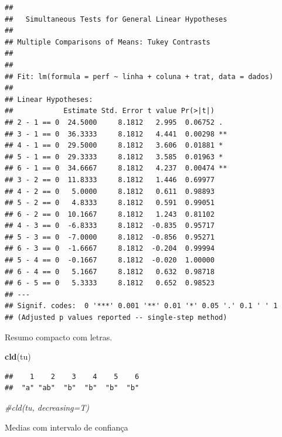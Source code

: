 \documentclass[
]{book}
\newenvironment{Shaded}{\begin{snugshade}}{\end{snugshade}}
\newcommand{\CommentTok}[1]{\textcolor[rgb]{0.56,0.35,0.01}{\textit{#1}}}
\newcommand{\DataTypeTok}[1]{\textcolor[rgb]{0.13,0.29,0.53}{#1}}
\newcommand{\KeywordTok}[1]{\textcolor[rgb]{0.13,0.29,0.53}{\textbf{#1}}}
\newcommand{\NormalTok}[1]{#1}
\newcommand{\OperatorTok}[1]{\textcolor[rgb]{0.81,0.36,0.00}{\textbf{#1}}}
\newcommand{\StringTok}[1]{\textcolor[rgb]{0.31,0.60,0.02}{#1}}
\begin{document}
\begin{verbatim}
## 
##   Simultaneous Tests for General Linear Hypotheses
## 
## Multiple Comparisons of Means: Tukey Contrasts
## 
## 
## Fit: lm(formula = perf ~ linha + coluna + trat, data = dados)
## 
## Linear Hypotheses:
##            Estimate Std. Error t value Pr(>|t|)   
## 2 - 1 == 0  24.5000     8.1812   2.995  0.06752 . 
## 3 - 1 == 0  36.3333     8.1812   4.441  0.00298 **
## 4 - 1 == 0  29.5000     8.1812   3.606  0.01881 * 
## 5 - 1 == 0  29.3333     8.1812   3.585  0.01963 * 
## 6 - 1 == 0  34.6667     8.1812   4.237  0.00474 **
## 3 - 2 == 0  11.8333     8.1812   1.446  0.69977   
## 4 - 2 == 0   5.0000     8.1812   0.611  0.98893   
## 5 - 2 == 0   4.8333     8.1812   0.591  0.99051   
## 6 - 2 == 0  10.1667     8.1812   1.243  0.81102   
## 4 - 3 == 0  -6.8333     8.1812  -0.835  0.95717   
## 5 - 3 == 0  -7.0000     8.1812  -0.856  0.95271   
## 6 - 3 == 0  -1.6667     8.1812  -0.204  0.99994   
## 5 - 4 == 0  -0.1667     8.1812  -0.020  1.00000   
## 6 - 4 == 0   5.1667     8.1812   0.632  0.98718   
## 6 - 5 == 0   5.3333     8.1812   0.652  0.98523   
## ---
## Signif. codes:  0 '***' 0.001 '**' 0.01 '*' 0.05 '.' 0.1 ' ' 1
## (Adjusted p values reported -- single-step method)
\end{verbatim}

Resumo compacto com letras.

\begin{Shaded}
\begin{Highlighting}[]
\KeywordTok{cld}\NormalTok{(tu)}
\end{Highlighting}
\end{Shaded}

\begin{verbatim}
##    1    2    3    4    5    6 
##  "a" "ab"  "b"  "b"  "b"  "b"
\end{verbatim}

\begin{Shaded}
\begin{Highlighting}[]
\CommentTok{#cld(tu, decreasing=T)}
\end{Highlighting}
\end{Shaded}

Medias com intervalo de confiança

\begin{Shaded}
\end{Shaded}
\end{document}
